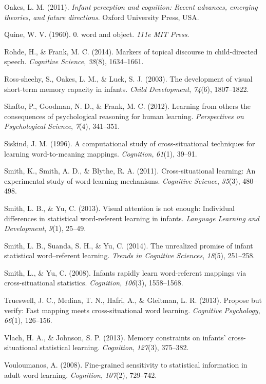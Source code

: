 \documentclass[a4paper,man,floatsintext]{apa6}
\begin{document}
Oakes, L. M. (2011). \emph{Infant perception and cognition: Recent
advances, emerging theories, and future directions}. Oxford University
Press, USA.

Quine, W. V. (1960). 0. word and object. \emph{111e MIT Press}.

Rohde, H., \& Frank, M. C. (2014). Markers of topical discourse in
child-directed speech. \emph{Cognitive Science}, \emph{38}(8),
1634--1661.

Ross-sheehy, S., Oakes, L. M., \& Luck, S. J. (2003). The development of
visual short-term memory capacity in infants. \emph{Child Development},
\emph{74}(6), 1807--1822.

Shafto, P., Goodman, N. D., \& Frank, M. C. (2012). Learning from others
the consequences of psychological reasoning for human learning.
\emph{Perspectives on Psychological Science}, \emph{7}(4), 341--351.

Siskind, J. M. (1996). A computational study of cross-situational
techniques for learning word-to-meaning mappings. \emph{Cognition},
\emph{61}(1), 39--91.

Smith, K., Smith, A. D., \& Blythe, R. A. (2011). Cross-situational
learning: An experimental study of word-learning mechanisms.
\emph{Cognitive Science}, \emph{35}(3), 480--498.

Smith, L. B., \& Yu, C. (2013). Visual attention is not enough:
Individual differences in statistical word-referent learning in infants.
\emph{Language Learning and Development}, \emph{9}(1), 25--49.

Smith, L. B., Suanda, S. H., \& Yu, C. (2014). The unrealized promise of
infant statistical word--referent learning. \emph{Trends in Cognitive
Sciences}, \emph{18}(5), 251--258.

Smith, L., \& Yu, C. (2008). Infants rapidly learn word-referent
mappings via cross-situational statistics. \emph{Cognition},
\emph{106}(3), 1558--1568.

Trueswell, J. C., Medina, T. N., Hafri, A., \& Gleitman, L. R. (2013).
Propose but verify: Fast mapping meets cross-situational word learning.
\emph{Cognitive Psychology}, \emph{66}(1), 126--156.

Vlach, H. A., \& Johnson, S. P. (2013). Memory constraints on infants'
cross-situational statistical learning. \emph{Cognition}, \emph{127}(3),
375--382.

Vouloumanos, A. (2008). Fine-grained sensitivity to statistical
information in adult word learning. \emph{Cognition}, \emph{107}(2),
729--742.
\end{document}
